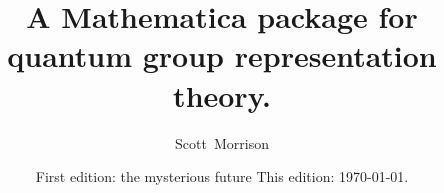 \title{A Mathematica package for quantum group representation theory.}

\author{Scott~Morrison}
\address{
}
\email{}
\urladdr{}

\date{
  First edition: the mysterious future
  This edition: \today.
}

\primaryclass{} \secondaryclass{}
\keywords{
}

